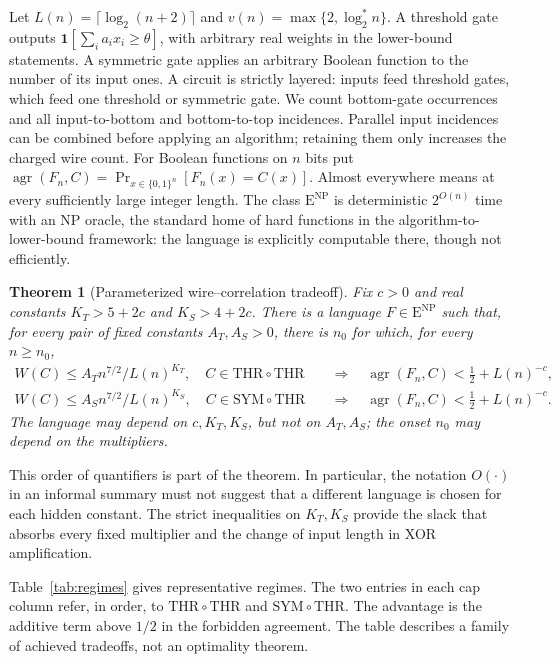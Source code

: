 \documentclass[11pt,letterpaper]{article}
\newtheorem{theorem}{Theorem}[section]
\theoremstyle{definition}
\theoremstyle{remark}
\newcommand{\THR}{\mathrm{THR}}
\newcommand{\SYM}{\mathrm{SYM}}
\newcommand{\ENP}{\mathrm{E}^{\mathrm{NP}}}
\newcommand{\ind}{\mathbf 1}
\newcommand{\agr}{\operatorname{agr}}
\begin{document}
Let $L(n)=\lceil\log_2(n+2)\rceil$ and
$v(n)=\max\{2,\log_2^*n\}$. A threshold gate outputs
$\ind[\sum_i a_i x_i\ge\theta]$, with arbitrary real weights in the
lower-bound statements. A symmetric gate applies an arbitrary Boolean
function to the number of its input ones. A circuit is strictly layered:
inputs feed threshold gates, which feed one threshold or symmetric gate.
We count bottom-gate occurrences and all input-to-bottom and bottom-to-top
incidences. Parallel input incidences can be combined before applying an
algorithm; retaining them only increases the charged wire count.
For Boolean functions on $n$ bits put
$\agr(F_n,C)=\Pr_{x\in\{0,1\}^n}[F_n(x)=C(x)]$.
Almost everywhere means at every sufficiently large integer length.
The class $\ENP$ is deterministic $2^{O(n)}$ time with an NP oracle,
the standard home of hard functions in the algorithm-to-lower-bound
framework: the language is explicitly computable there, though not
efficiently.

\begin{theorem}[Parameterized wire--correlation tradeoff]
\label{thm:tradeoff}
Fix $c>0$ and real constants $K_T>5+2c$ and $K_S>4+2c$.
There is a language $F\in\ENP$ such that, for every pair of fixed
constants $A_T,A_S>0$, there is $n_0$ for which, for every $n\ge n_0$,
\begin{align*}
W(C)\le A_T n^{7/2}/L(n)^{K_T},\quad C\in\THR\circ\THR
&\quad\Longrightarrow\quad \agr(F_n,C)<\tfrac12+L(n)^{-c},\\
W(C)\le A_S n^{7/2}/L(n)^{K_S},\quad C\in\SYM\circ\THR
&\quad\Longrightarrow\quad \agr(F_n,C)<\tfrac12+L(n)^{-c}.
\end{align*}
The language may depend on $c,K_T,K_S$, but not on $A_T,A_S$;
the onset $n_0$ may depend on the multipliers.
\end{theorem}

This order of quantifiers is part of the theorem. In particular, the
notation $O(\cdot)$ in an informal summary must not suggest that a
different language is chosen for each hidden constant. The strict
inequalities on $K_T,K_S$ provide the slack that absorbs every fixed
multiplier and the change of input length in XOR amplification.

Table~\ref{tab:regimes} gives representative regimes. The two entries in
each cap column refer, in order, to $\THR\circ\THR$ and
$\SYM\circ\THR$. The advantage is the additive term above $1/2$ in
the forbidden agreement. The table describes a family of achieved
tradeoffs, not an optimality theorem.
\end{document}
